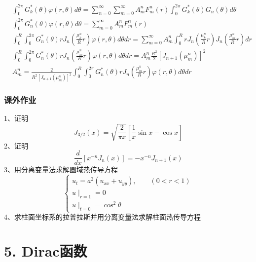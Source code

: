 \begin{frame}
	\begin{equation*}
		\begin{split}
				 &\int_0 ^{2\pi} G_k ^* (\theta) \varphi(r, \theta) d\theta =\sum_{n=0}^{\infty} \sum_{m=0}^{\infty} A_m ^n F_m ^n (r) \int_0 ^{2\pi} G^* _k(\theta) G_n(\theta)  d\theta	\\ 
				 &\int_0 ^{2\pi} G_n  ^* (\theta) \varphi(r, \theta) d\theta = \sum_{m=0}^{\infty} A_m ^n F_m ^n (r)\\ 
				 &\int_0 ^{R} \int_0 ^{2\pi} G_n ^* (\theta) r J_n (\frac{\mu_{k}^{n}}{R}r) \varphi(r, \theta) d\theta dr = \sum_{m=0}^{\infty} A_m ^n \int_0 ^{R} r J_n (\frac{\mu_{k}^{n}}{R}r)J_n (\frac{\mu_{m}^{n}}{R}r) dr \\
				 &\int_0 ^{R} \int_0 ^{2\pi} G_n ^* (\theta) r J_n (\frac{\mu_{m}^{n}}{R}r) \varphi(r, \theta) d\theta dr = A_m ^n \frac{R^2}{2} [J_{n+1}(\mu_m ^n)]^2\\ 
				 &A_m ^n=	\frac{2}{R^2[J_{n+1}(\mu_m ^n)]^2} \int_0 ^{R} \int_0 ^{2\pi} G_n ^* (\theta) r J_n (\frac{\mu_{m}^{n}}{R}r) \varphi(r, \theta) d\theta dr 
		\end{split}
	\end{equation*}
\end{frame}	

\begin{frame}
	\frametitle{课外作业}
	1、证明 
	\begin{equation*}
		J_{3/2}(x)=\sqrt{\frac{2}{\pi x}} [\frac{1}{x}\sin x -\cos x]
	\end{equation*}
	2、证明
	\begin{equation*}
		\frac{d}{d x}\left[x^{-n} J_{n}(x)\right]=-x^{-n} J_{n+1}(x) 
	\end{equation*}	
	3、用分离变量法求解圆域热传导方程
	\[\begin{cases}
		u_t=a^2 (u_{xx}+u_{yy}), \qquad (0<r<1) \\
		u\mid_{r=1}=0 \\
		u\mid_{t=0}=\cos^2\theta
	\end{cases}\]
	4、求柱面坐标系的拉普拉斯并用分离变量法求解柱面热传导方程	
\end{frame}	


\section{5. Dirac函数}
